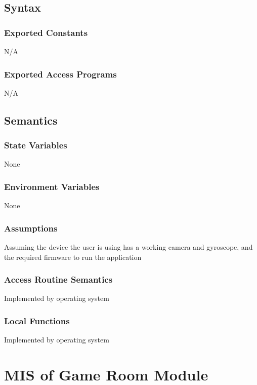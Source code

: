 \documentclass[12pt, titlepage]{article}
\begin{document}
\subsection{Syntax}

\subsubsection{Exported Constants}
N/A
\subsubsection{Exported Access Programs}
N/A
\subsection{Semantics}

\subsubsection{State Variables}

None

\subsubsection{Environment Variables}

None

\subsubsection{Assumptions}

Assuming the device the user is using has a working camera and gyroscope, and the required firmware to run the application

\subsubsection{Access Routine Semantics}

Implemented by operating system

\subsubsection{Local Functions}

Implemented by operating system

\newpage

\section{MIS of Game Room Module} \label{sec:GameRoomModule} 
\end{document}
